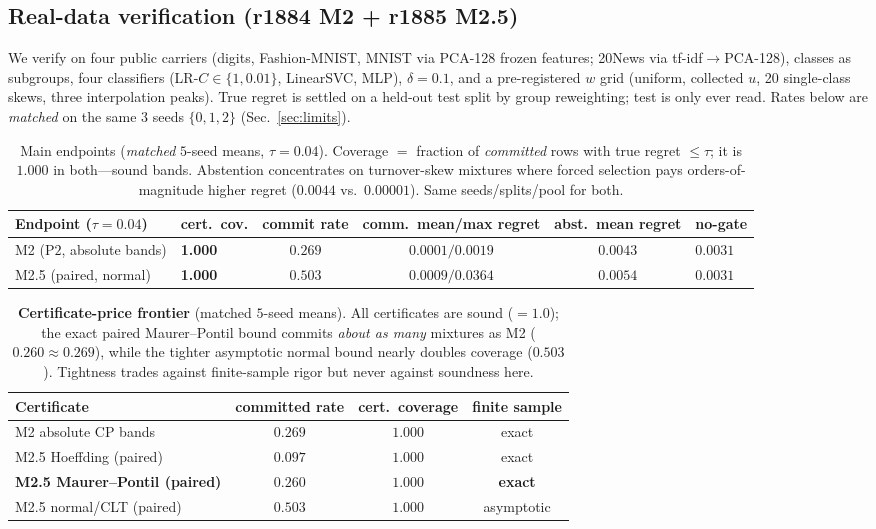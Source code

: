 \documentclass{article}
\begin{document}
\subsection{Real-data verification (r1884 M2 + r1885 M2.5)}
We verify on four public carriers (digits, Fashion-MNIST, MNIST via PCA-128 frozen features;
20News via tf-idf$\to$PCA-128), classes as subgroups, four classifiers (LR-$C{\in}\{1,0.01\}$,
LinearSVC, MLP), $\delta{=}0.1$, and a pre-registered $w$ grid (uniform, collected $u$, 20
single-class skews, three interpolation peaks). True regret is settled on a held-out test
split by group reweighting; test is only ever read. Rates below are \emph{matched} on the
same $3$ seeds $\{0,1,2\}$ (Sec.~\ref{sec:limits}).

\begin{table}[t]
\centering\small\setlength{\tabcolsep}{4pt}
\begin{tabular}{llcccl}
\toprule
Endpoint ($\tau{=}0.04$) & cert.\ cov. & commit rate &
 comm.\ mean/max regret & abst.\ mean regret & no-gate \\
\midrule
M2 ($\mathrm{P2}$, absolute bands) &
 \textbf{1.000} & $0.269$ &
 $0.0001/0.0019$ & $0.0043$ & $0.0031$ \\
M2.5 (paired, normal) &
 \textbf{1.000} & $0.503$ &
 $0.0009/0.0364$ & $0.0054$ & $0.0031$ \\
\bottomrule
\end{tabular}
\caption{Main endpoints (\emph{matched} $5$-seed means, $\tau{=}0.04$). Coverage $=$ fraction
of \emph{committed} rows with true regret $\le\tau$; it is $1.000$ in both---sound bands.
Abstention concentrates on turnover-skew mixtures where forced selection pays orders-of-
magnitude higher regret ($0.0044$ vs.\ $0.00001$). Same seeds/splits/pool for both.}
\label{tab:main}
\end{table}

\begin{table}[t]
\centering\small
\begin{tabular}{lccc}
\toprule
Certificate & committed rate & cert.\ coverage & finite sample \\
\midrule
M2 absolute CP bands & $0.269$ & $1.000$ & exact \\
M2.5 Hoeffding (paired) & $0.097$ & $1.000$ & exact \\
\bfseries M2.5 Maurer--Pontil (paired) &
 \bfseries $0.260$ & \bfseries $1.000$ & \bfseries exact \\
M2.5 normal/CLT (paired) &
 $0.503$ & $1.000$ & asymptotic \\
\bottomrule
\end{tabular}
\caption{\textbf{Certificate-price frontier} (matched $5$-seed means). All certificates are
sound ($=1.0$); the exact paired Maurer--Pontil bound commits \emph{about as many} mixtures
as M2 ($0.260\approx0.269$), while the tighter asymptotic normal bound nearly doubles coverage
($0.503$). Tightness trades against finite-sample rigor but never against soundness here.}
\label{tab:frontier}
\end{table}
\end{document}
